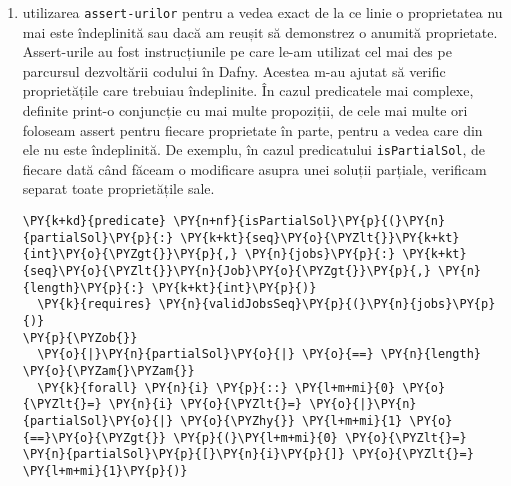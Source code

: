 \begin{enumerate}
\begin{Verbatim}[commandchars=\\\{\}, fontsize=\footnotesize]
      \PY{k}{assert} \PY{n}{isOptParSol}\PY{p}{(}\PY{n}{solution}\PY{p}{,} \PY{n}{jobs}\PY{p}{,} \PY{n}{i} \PY{o}{+} \PY{l+m+mi}{1}\PY{p}{)}\PY{p}{;}
    \PY{p}{\PYZcb{}}
    \PY{k}{else}
    \PY{p}{\PYZob{}}
      \PY{k}{assume} \PY{k+kc}{false}\PY{p}{;}
      \PY{n}{solution}\PY{p}{,} \PY{n}{dp} \PY{o}{:=} 
       \PY{n}{leadsToOptWithJobI}\PY{p}{(}\PY{n}{jobs}\PY{p}{,} \PY{n}{dp}\PY{p}{,} \PY{n}{allSol}\PY{p}{,} \PY{n}{i}\PY{p}{,} \PY{n}{maxProfit}\PY{p}{,} \PY{n}{optParSolWithI}\PY{p}{)}\PY{p}{;}
      \PY{k}{assert} \PY{n}{isOptParSol}\PY{p}{(}\PY{n}{solution}\PY{p}{,} \PY{n}{jobs}\PY{p}{,} \PY{n}{i} \PY{o}{+} \PY{l+m+mi}{1}\PY{p}{)}\PY{p}{;}
    \PY{p}{\PYZcb{}}
    \PY{n}{allSol} \PY{o}{:=} \PY{n}{allSol} \PY{o}{+} \PY{p}{[}\PY{n}{solution}\PY{p}{]}\PY{p}{;} 
    \PY{n}{i} \PY{o}{:=} \PY{n}{i} \PY{o}{+} \PY{l+m+mi}{1}\PY{p}{;}
  \PY{p}{\PYZcb{}}
  \PY{n}{sol} \PY{o}{:=} \PY{n}{solution}\PY{p}{;}
  \PY{n}{profit} \PY{o}{:=} \PY{n}{dp}\PY{p}{[}\PY{o}{|}\PY{n}{dp}\PY{o}{|}\PY{o}{\PYZhy{}}\PY{l+m+mi}{1}\PY{p}{]}\PY{p}{;}
\PY{p}{\PYZcb{}}
\end{Verbatim}
    \item utilizarea \texttt{assert-urilor} pentru a vedea exact de la ce linie o proprietatea nu mai este îndeplinită sau dacă am reușit să demonstrez o anumită proprietate. Assert-urile au fost instrucțiunile pe care le-am utilizat cel mai des pe parcursul dezvoltării codului în Dafny. Acestea m-au ajutat să verific proprietățile care trebuiau îndeplinite. În cazul predicatele mai complexe, definite print-o conjuncție cu mai multe propoziții, de cele mai multe ori foloseam assert pentru fiecare proprietate în parte, pentru a vedea care din ele nu este îndeplinită. 
    De exemplu, în cazul predicatului \texttt{isPartialSol}, de fiecare dată când făceam o modificare asupra unei soluții parțiale, verificam separat toate proprietățile sale. 
    \begin{Verbatim}[commandchars=\\\{\}, fontsize=\footnotesize]
\PY{k+kd}{predicate} \PY{n+nf}{isPartialSol}\PY{p}{(}\PY{n}{partialSol}\PY{p}{:} \PY{k+kt}{seq}\PY{o}{\PYZlt{}}\PY{k+kt}{int}\PY{o}{\PYZgt{}}\PY{p}{,} \PY{n}{jobs}\PY{p}{:} \PY{k+kt}{seq}\PY{o}{\PYZlt{}}\PY{n}{Job}\PY{o}{\PYZgt{}}\PY{p}{,} \PY{n}{length}\PY{p}{:} \PY{k+kt}{int}\PY{p}{)}
  \PY{k}{requires} \PY{n}{validJobsSeq}\PY{p}{(}\PY{n}{jobs}\PY{p}{)}
\PY{p}{\PYZob{}}
  \PY{o}{|}\PY{n}{partialSol}\PY{o}{|} \PY{o}{==} \PY{n}{length} \PY{o}{\PYZam{}\PYZam{}}
  \PY{k}{forall} \PY{n}{i} \PY{p}{::} \PY{l+m+mi}{0} \PY{o}{\PYZlt{}=} \PY{n}{i} \PY{o}{\PYZlt{}=} \PY{o}{|}\PY{n}{partialSol}\PY{o}{|} \PY{o}{\PYZhy{}} \PY{l+m+mi}{1} \PY{o}{==}\PY{o}{\PYZgt{}} \PY{p}{(}\PY{l+m+mi}{0} \PY{o}{\PYZlt{}=} \PY{n}{partialSol}\PY{p}{[}\PY{n}{i}\PY{p}{]} \PY{o}{\PYZlt{}=} \PY{l+m+mi}{1}\PY{p}{)}

\end{Verbatim}
\end{enumerate}
